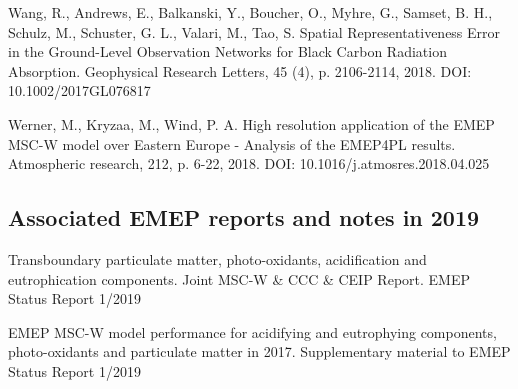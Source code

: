 \begin{list}{}{\setlength{\leftmargin}{15pt}\setlength{\itemindent}{-\leftmargin}}
\item[]
Wang, R., Andrews, E., Balkanski, Y., Boucher, O., Myhre, G., Samset, B. H., Schulz, M., Schuster, G. L., Valari, M., Tao, S. 
Spatial Representativeness Error in the Ground-Level Observation Networks for Black Carbon Radiation Absorption. 
Geophysical Research Letters, 45 (4), p. 2106-2114, 2018. 
DOI: 10.1002/2017GL076817

\item[]
Werner, M., Kryzaa, M., Wind, P. A. 
High resolution application of the EMEP MSC-W model over Eastern Europe - Analysis of the EMEP4PL results. 
Atmospheric research, 212, p. 6-22, 2018. 
DOI: 10.1016/j.atmosres.2018.04.025  


\end{list}


\subsection*{Associated EMEP reports and notes in 2019}

\vspace{0.5cm}

\enlargethispage{\baselineskip}
\begin{list}{}{\setlength{\leftmargin}{15pt}\setlength{\itemindent}{-\leftmargin}}\small
\item[]
Transboundary particulate matter, photo-oxidants, acidification and eutrophication components. Joint MSC-W \& CCC \& CEIP Report. EMEP Status Report 1/2019

\item[] EMEP MSC-W model performance for acidifying and
  eutrophying components, photo-oxidants and particulate matter in
  2017. Supplementary material to EMEP Status Report 1/2019


\end{list}







